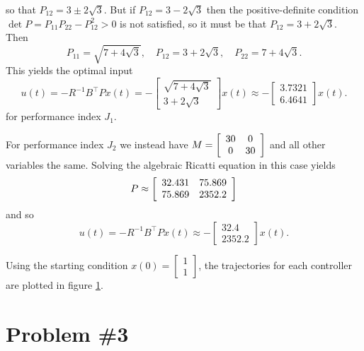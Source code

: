 \documentclass{article}
\begin{document}
so that $P_{12} = 3 \pm 2 \sqrt{3}$. But if
$P_{12} = 3 - 2\sqrt{3}$ then the positive-definite condition
$\det P = P_{11} P_{22} - P_{12}^2 > 0$ is not satisfied, so it must
be that $P_{12} = 3 + 2 \sqrt{3}$. Then
$$
P_{11} = \sqrt{7 + 4\sqrt{3}}, \quad
P_{12} = 3 + 2\sqrt{3}, \quad
P_{22} = 7 + 4\sqrt{3}.
$$
This yields the optimal input
$$
u(t)
 = -R^{-1} B^\top P x(t)
 = -\left[\begin{array}{c}
      \sqrt{7 + 4\sqrt{3}} \\
      3 + 2 \sqrt{3}
    \end{array}\right] x(t)
 \approx
   -\left[\begin{array}{c}
       3.7321 \\
       6.4641
    \end{array}\right] x(t).
$$
for performance index $J_1$.

For performance index $J_2$ we instead have
$M = \left[\begin{array}{c c}
       30 &  0 \\
       0  & 30
     \end{array}\right]$
and all other variables the same. Solving the algebraic Ricatti
equation in this case yields
$$
P \approx
  \left[\begin{array}{c c}
    32.431 & 75.869 \\
    75.869 & 2352.2
  \end{array}\right]
$$
and so
$$
u(t)
 = -R^{-1} B^\top P x(t)
 \approx
   -\left[\begin{array}{c}
        32.4 \\
      2352.2
    \end{array}\right] x(t).
$$

Using the starting condition
$x(0) = \left[\begin{array}{c}
          1 \\ 1
        \end{array}\right]$, the trajectories for each controller are
      plotted in figure \ref{fig:prob2}.

\begin{figure}
  \caption{\label{fig:prob2}}
\end{figure}

\section*{Problem \#3}
\end{document}
